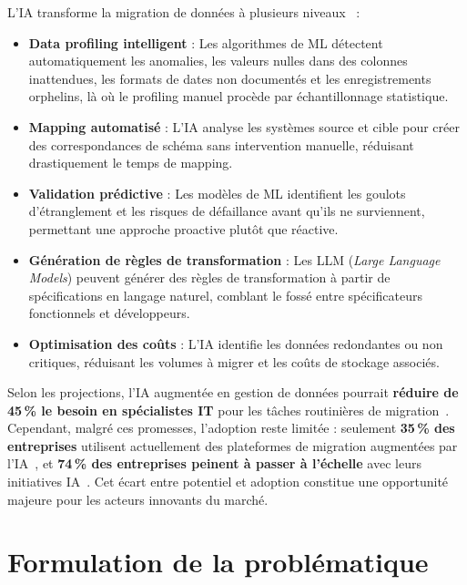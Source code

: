 L'IA transforme la migration de données à plusieurs niveaux~\cite{buzzclan2026,
ispirer_ai} :

\begin{itemize}
    \item \textbf{Data profiling intelligent} : Les algorithmes de ML
    détectent automatiquement les anomalies, les valeurs nulles dans des
    colonnes inattendues, les formats de dates non documentés et les
    enregistrements orphelins, là où le profiling manuel procède par
    échantillonnage statistique.

    \item \textbf{Mapping automatisé} : L'IA analyse les systèmes source
    et cible pour créer des correspondances de schéma sans intervention
    manuelle, réduisant drastiquement le temps de mapping.

    \item \textbf{Validation prédictive} : Les modèles de ML identifient
    les goulots d'étranglement et les risques de défaillance avant qu'ils
    ne surviennent, permettant une approche proactive plutôt que réactive.

    \item \textbf{Génération de règles de transformation} : Les LLM
    (\textit{Large Language Models}) peuvent générer des règles de
    transformation à partir de spécifications en langage naturel, comblant
    le fossé entre spécificateurs fonctionnels et développeurs.

    \item \textbf{Optimisation des coûts} : L'IA identifie les données
    redondantes ou non critiques, réduisant les volumes à migrer et les
    coûts de stockage associés.
\end{itemize}

Selon les projections, l'IA augmentée en gestion de données pourrait
\textbf{réduire de 45\,\% le besoin en spécialistes IT} pour les tâches
routinières de migration~\cite{ispirer_ai}. Cependant, malgré ces promesses,
l'adoption reste limitée : seulement \textbf{35\,\% des entreprises}
utilisent actuellement des plateformes de migration augmentées par
l'IA~\cite{reanin2025}, et \textbf{74\,\% des entreprises peinent à
passer à l'échelle} avec leurs initiatives IA~\cite{integrate_io_stats}.
Cet écart entre potentiel et adoption constitue une opportunité majeure
pour les acteurs innovants du marché.

\section{Formulation de la problématique}

